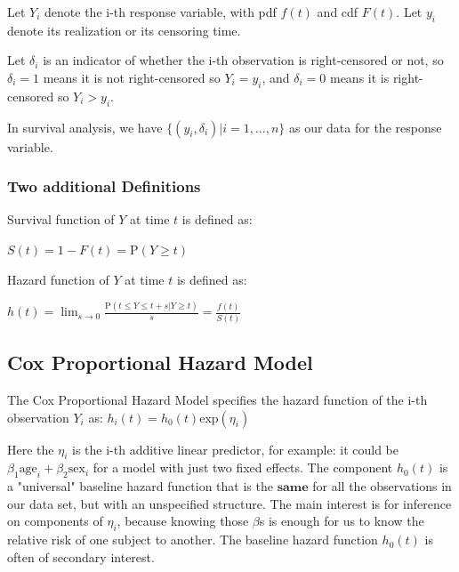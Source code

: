 \documentclass{beamer} %
\begin{document}
\begin{frame}
Let $Y_i$ denote the i-th response variable, with pdf $f(t)$ and cdf $F(t)$. Let $y_i$ denote its realization or its censoring time. 
\pause 
\newline

Let $\delta_i$ is an indicator of whether the i-th observation is right-censored or not, so $\delta_i = 1$  means it is not right-censored so $Y_i = y_i$, and $\delta_i = 0$  means it is right-censored so $Y_i > y_i$.
\pause 
\newline

In survival analysis, we have $\{(y_i,\delta_i)|i = 1, ..., n\}$ as our data for the response variable.
\end{frame}

\begin{frame}
\frametitle{Two additional Definitions}
\begin{definition}
Survival function of $Y$ at time $t$ is defined as:
\newline

\centering
$S(t) = 1- F(t) = \text{P}(Y\geq t)$
\end{definition}

\pause

\begin{definition}
Hazard function of $Y$ at time $t$ is defined as:
\newline

\centering
$h(t) = \lim_{s\to 0} \frac{\text{P}(t\le Y \le t+s |Y\ge t)}{s} = \frac{f(t)}{S(t)}$
\end{definition}

\end{frame}

\subsection{Cox Proportional Hazard Model}
\begin{frame}

\begin{definition}
The Cox Proportional Hazard Model specifies the hazard function of the i-th observation $Y_i$ as:
\newline
\centering
$h_{i}(t) = h_{0}(t) \text{exp}(\eta_i)$
\end{definition}
\pause
Here the $\eta_i$ is the i-th additive linear predictor, for example: it could be $\beta_1\text{age}_i + \beta_2\text{sex}_i$ for a model with just two fixed effects. \newline
\pause
\newline
The component $h_{0}(t)$ is a "universal" baseline hazard function that is the $\textbf{same}$ for all the observations in our data set, but with an unspecified structure.\newline
\pause
\newline
The main interest is for inference on components of $\eta_i$, because knowing those $\beta$s is enough for us to know the relative risk of one subject to another. The baseline hazard function $h_{0}(t)$ is often of secondary interest.


\end{frame}
\end{document}
